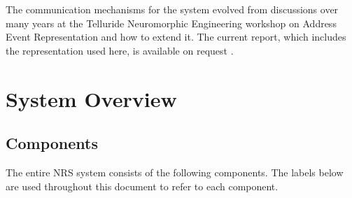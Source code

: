 \documentclass[pdftex,a4paper]{article}
\begin{document}
The communication mechanisms for the system evolved from discussions
over many years at the Telluride Neuromorphic Engineering workshop on
Address Event Representation and how to extend it. The current report,
which includes the representation used here, is available on request .

\section{System Overview}

\subsection{Components}

The entire NRS system consists of the following components. The labels
below are used throughout this document to refer to each
component.
\end{document}
